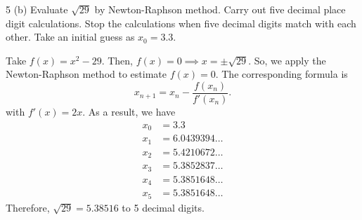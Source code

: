 \documentclass[11pt]{penrose}
\begin{document}
\begin{problem}{5 (b)}
    Evaluate $\sqrt{29}$ by Newton-Raphson method. Carry out five decimal place digit calculations. Stop the calculations when five decimal digits match with each other. Take an initial guess as $x_0 = 3.3$.

    \solution Take $f(x) = x^2 - 29$. Then, $f(x) = 0 \implies x = \pm \sqrt{29}$. So, we apply the Newton-Raphson method to estimate $f(x) = 0$. The corresponding formula is
    \begin{equation*}
        x_{n+1} = x_{n} - \frac{f(x_n)}{f'(x_n)}.
    \end{equation*}
    with $f'(x) = 2x$. As a result, we have
    \begin{align*}
        x_0 &= 3.3\\
        x_1 &= 6.0439394\dots\\
        x_2 &= 5.4210672\dots\\
        x_3 &= 5.3852837\dots\\
        x_4 &= 5.3851648\dots\\
        x_5 &= 5.3851648\dots
    \end{align*}
    Therefore, $\sqrt{29} = 5.38516$ to 5 decimal digits.
\end{problem}
\end{document}
